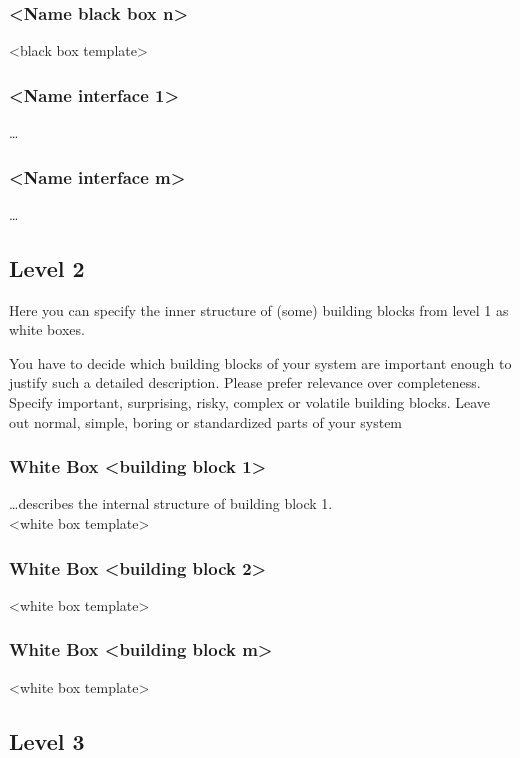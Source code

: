 \subsubsection{\textless Name black box n\textgreater}
\textless black box template\textgreater

\subsubsection{\textless Name interface 1\textgreater}
\dots

\subsubsection{\textless Name interface m\textgreater}
\dots

\subsection{Level 2}

Here you can specify the inner structure of (some) building blocks from level 1 as white boxes.

You have to decide which building blocks of your system are important enough to justify such a detailed description. Please prefer relevance over completeness. Specify important, surprising, risky, complex or volatile building blocks. Leave out normal, simple, boring or standardized parts of your system

\subsubsection{White Box \textless building block 1\textgreater}
\dots describes the internal structure of building block 1.\\
\textless white box template\textgreater

\subsubsection{White Box \textless building block 2\textgreater}
\textless white box template\textgreater

\subsubsection{White Box \textless building block m\textgreater}
\textless white box template\textgreater

\subsection{Level 3}

